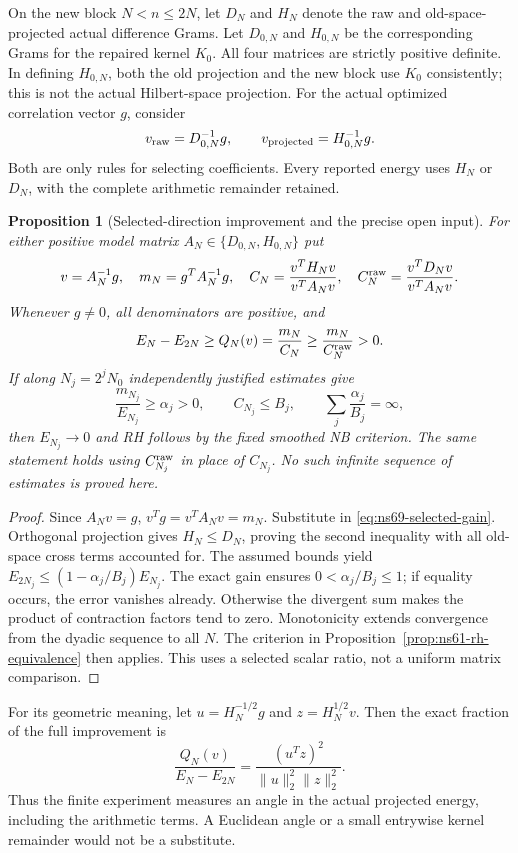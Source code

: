 \documentclass[11pt]{article}
\newtheorem{proposition}[theorem]{Proposition}
\theoremstyle{remark}
\begin{document}
On the new block $N<n\leq2N$, let $D_N$ and $H_N$ denote the raw
and old-space-projected actual difference Grams. Let $D_{0,N}$ and
$H_{0,N}$ be the corresponding Grams for the repaired kernel $K_0$.
All four matrices are strictly positive definite. In defining $H_{0,N}$,
both the old projection and the new block use $K_0$ consistently;
this is not the actual Hilbert-space projection.
For the actual optimized correlation vector $g$, consider
\[
 v_{\rm raw}=D_{0,N}^{-1}g,\qquad
 v_{\rm projected}=H_{0,N}^{-1}g.
\]
Both are only rules for selecting coefficients. Every reported energy
uses $H_N$ or $D_N$, with the complete arithmetic remainder retained.

\begin{proposition}[Selected-direction improvement and the precise open input]
\label{prop:ns71-selected-input}
For either positive model matrix $A_N\in\{D_{0,N},H_{0,N}\}$ put
\[
 v=A_N^{-1}g,\quad m_N=g^TA_N^{-1}g,\quad
 C_N=\frac{v^TH_Nv}{v^TA_Nv},\quad
 C_N^{\rm raw}=\frac{v^TD_Nv}{v^TA_Nv}.
\]
Whenever $g\ne0$, all denominators are positive, and
\begin{equation}
 E_N-E_{2N}\geq Q_N(v)=\frac{m_N}{C_N}
                  \geq\frac{m_N}{C_N^{\rm raw}}>0.
 \label{eq:ns71-selected-ratio}
\end{equation}
If along $N_j=2^jN_0$ independently justified estimates give
\[
 \frac{m_{N_j}}{E_{N_j}}\geq\alpha_j>0,
 \qquad C_{N_j}\leq B_j,
 \qquad \sum_j\frac{\alpha_j}{B_j}=\infty,
\]
then $E_{N_j}\to0$ and RH follows by the fixed smoothed NB criterion.
The same statement holds using $C_{N_j}^{\rm raw}$ in place of $C_{N_j}$.
No such infinite sequence of estimates is proved here.
\end{proposition}
\begin{proof}
Since $A_Nv=g$, $v^Tg=v^TA_Nv=m_N$. Substitute in
\eqref{eq:ns69-selected-gain}. Orthogonal projection gives
$H_N\leq D_N$, proving the second inequality with all old-space
cross terms accounted for. The assumed bounds yield
$E_{2N_j}\leq(1-\alpha_j/B_j)E_{N_j}$.
The exact gain ensures $0<\alpha_j/B_j\leq1$; if equality occurs,
the error vanishes already. Otherwise the divergent sum makes the
product of contraction factors tend to zero. Monotonicity extends
convergence from the dyadic sequence to all $N$. The criterion in
Proposition~\ref{prop:ns61-rh-equivalence} then applies.
This uses a selected scalar ratio, not a uniform matrix comparison.
\end{proof}

For its geometric meaning, let $u=H_N^{-1/2}g$ and
$z=H_N^{1/2}v$. Then the exact fraction of the full improvement is
\[
 \frac{Q_N(v)}{E_N-E_{2N}}=
       \frac{(u^Tz)^2}{\|u\|_2^2\|z\|_2^2}.
\]
Thus the finite experiment measures an angle in the actual projected
energy, including the arithmetic terms. A Euclidean angle or a small
entrywise kernel remainder would not be a substitute.
\end{document}
